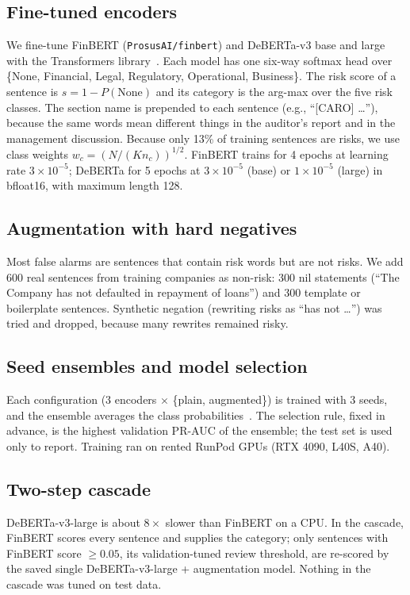 \documentclass[conference]{IEEEtran}
\begin{document}
\subsection{Fine-tuned encoders}
We fine-tune FinBERT (\texttt{ProsusAI/finbert}) and DeBERTa-v3 base and large with the Transformers library~\cite{wolf2020}. Each model has one six-way softmax head over \{None, Financial, Legal, Regulatory, Operational, Business\}. The risk score of a sentence is $s = 1 - P(\text{None})$ and its category is the arg-max over the five risk classes. The section name is prepended to each sentence (e.g., ``[CARO] \ldots''), because the same words mean different things in the auditor's report and in the management discussion. Because only 13\% of training sentences are risks, we use class weights $w_c = (N / (K n_c))^{1/2}$. FinBERT trains for 4 epochs at learning rate $3\times10^{-5}$; DeBERTa for 5 epochs at $3\times10^{-5}$ (base) or $1\times10^{-5}$ (large) in bfloat16, with maximum length 128.

\subsection{Augmentation with hard negatives}
Most false alarms are sentences that contain risk words but are not risks. We add 600 real sentences from training companies as non-risk: 300 nil statements (``The Company has not defaulted in repayment of loans'') and 300 template or boilerplate sentences. Synthetic negation (rewriting risks as ``has not \ldots'') was tried and dropped, because many rewrites remained risky.

\subsection{Seed ensembles and model selection}
Each configuration (3 encoders $\times$ \{plain, augmented\}) is trained with 3 seeds, and the ensemble averages the class probabilities~\cite{lakshminarayanan2017}. The selection rule, fixed in advance, is the highest validation PR-AUC of the ensemble; the test set is used only to report. Training ran on rented RunPod GPUs (RTX 4090, L40S, A40).

\subsection{Two-step cascade}
DeBERTa-v3-large is about $8\times$ slower than FinBERT on a CPU. In the cascade, FinBERT scores every sentence and supplies the category; only sentences with FinBERT score $\ge 0.05$, its validation-tuned review threshold, are re-scored by the saved single DeBERTa-v3-large + augmentation model. Nothing in the cascade was tuned on test data.
\end{document}
